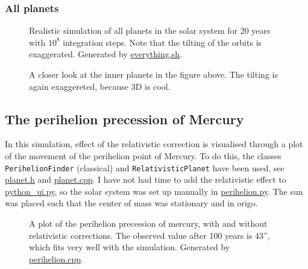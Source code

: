 \documentclass[12pt,english,a4paper]{article}
\newcommand{\program}[1]{\href{https://github.com/anjohan/Offentlig/blob/master/FYS3150/Oblig3/#1}{#1}}
\begin{document}
%
\subsubsection{All planets}
\begin{figure}[H]
\centering

\caption{Realistic simulation of all planets in the solar system for 20 years with \(10^8\) integration steps. Note that the tilting of the orbits is exaggerated. Generated by \program{everything.sh}.}
\end{figure}

\begin{figure}[H]
\centering

\caption{A closer look at the inner planets in the figure above. The tilting is again exaggereted, because 3D is cool.}
\end{figure}


\subsection{The perihelion precession of Mercury}
In this simulation, effect of the relativistic correction is visualised through a plot of the movement of the perihelion point of Mercury. To do this, the classes \texttt{PerihelionFinder} (classical) and \texttt{RelativisticPlanet} have been used, see \program{planet.h} and \program{planet.cpp}. I have not had time to add the relativistic effect to \program{python\_ui.py}, so the solar system was set up manually in \program{perihelion.py}. The sun was placed such that the center of mass was stationary and in origo.
\begin{figure}[H]
\centering

\caption{A plot of the perihelion precession of mercury, with and without relativistic corrections. The observed value after 100 years is 43'', which fits very well with the simulation. Generated by \program{perihelion.cpp}.}
\end{figure}


\end{document}
